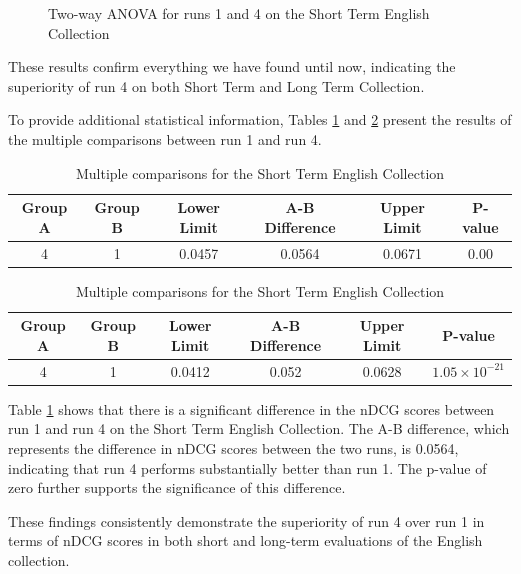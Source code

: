 \begin{figure}[!h]
\begin{subfigure}[b]{0.49\textwidth}
        \label{fig:st_anova_eng_ap}
    \end{subfigure}
    \caption{Two-way ANOVA for runs 1 and 4 on the Short Term English Collection}
    \label{fig:st_anova_eng}
\end{figure}
 
These results confirm everything we have found until now, indicating the superiority of run 4 on both Short Term and Long Term Collection.

To provide additional statistical information, Tables \ref{table:st_anova_eng} and \ref{table:st_anova_eng_ap} present the results of the multiple comparisons between run 1 and run 4.

\begin{table}[!h]
    \centering
    \caption{Multiple comparisons for the Short Term English Collection}
    \label{table:st_anova_eng}
    \begin{tabular}{cccccc}
    \hline
    Group A & Group B & Lower Limit & A-B Difference & Upper Limit & P-value \\
    \hline
    4 & 1 & 0.0457 & 0.0564 & 0.0671 & 0.00 \\
    \hline
    \end{tabular}
\end{table}

\begin{table}[!h]
    \centering
    \caption{Multiple comparisons for the Short Term English Collection}
    \label{table:st_anova_eng_ap}
    \begin{tabular}{cccccc}
    \hline
    Group A & Group B & Lower Limit & A-B Difference & Upper Limit & P-value \\
    \hline
    4 & 1 & 0.0412 & 0.052 & 0.0628 & $1.05 \times 10^{-21}$ \\
    \hline
    \end{tabular}
\end{table}

Table \ref{table:st_anova_eng} shows that there is a significant difference in the \ac{nDCG} scores between run 1 and run 4 on the Short Term English Collection. 
The A-B difference, which represents the difference in \ac{nDCG} scores between the two runs, is 0.0564, indicating that run 4 performs substantially better than run 1. 
The p-value of zero further supports the significance of this difference.

These findings consistently demonstrate the superiority of run 4 over run 1 in terms of \ac{nDCG} scores in both short and long-term evaluations of the English collection.


